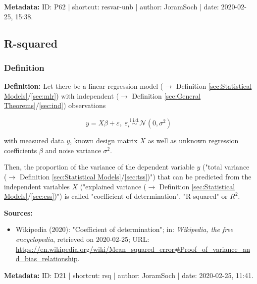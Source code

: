 \documentclass[a4paper,12pt,twoside]{book}
\begin{document}
\vspace{1em}
\textbf{Metadata:} ID: P62 | shortcut: resvar-unb | author: JoramSoch | date: 2020-02-25, 15:38.
\vspace{1em}



\subsection{R-squared}

\subsubsection[\textit{Definition}]{Definition} \label{sec:rsq}
\setcounter{equation}{0}

\textbf{Definition:} Let there be a linear regression model ($\rightarrow$ Definition \ref{sec:Statistical Models}/\ref{sec:mlr}) with independent ($\rightarrow$ Definition \ref{sec:General Theorems}/\ref{sec:ind}) observations

\begin{equation} \label{eq:rsq-mlr}
y = X\beta + \varepsilon, \; \varepsilon_i \overset{\mathrm{i.i.d.}}{\sim} \mathcal{N}(0, \sigma^2)
\end{equation}

with measured data $y$, known design matrix $X$ as well as unknown regression coefficients $\beta$ and noise variance $\sigma^2$.

Then, the proportion of the variance of the dependent variable $y$ ("total variance ($\rightarrow$ Definition \ref{sec:Statistical Models}/\ref{sec:tss})") that can be predicted from the independent variables $X$ ("explained variance ($\rightarrow$ Definition \ref{sec:Statistical Models}/\ref{sec:ess})") is called "coefficient of determination", "R-squared" or $R^2$.


\vspace{1em}
\textbf{Sources:}
\begin{itemize}
\item Wikipedia (2020): "Coefficient of determination"; in: \textit{Wikipedia, the free encyclopedia}, retrieved on 2020-02-25; URL: \url{https://en.wikipedia.org/wiki/Mean_squared_error#Proof_of_variance_and_bias_relationship}.
\end{itemize}


\vspace{1em}
\textbf{Metadata:} ID: D21 | shortcut: rsq | author: JoramSoch | date: 2020-02-25, 11:41.
\vspace{1em}
\end{document}
